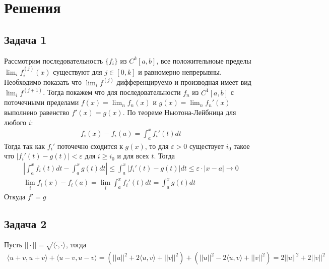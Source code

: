 
\newpage
\section*{Решения}
\subsection*{Задача 1}
	Рассмотрим последовательность $\{f_i\}$ из $C^k [a,b]$, все положительноые пределы $\lim_i f_i^{(j)}(x)$ существуют для $j \in [0,k]$ и равномерно непрерывны. Необходимо показать что $\lim_i f^{(j)}$ дифференцируемо и производная имеет вид $\lim_i f^{(j+1)}$. Тогда покажем что для последовательности $f_n$ из $C^{1}[a,b]$ с поточечными пределами $f(x) = \lim_n f_n(x)$ и $g(x) = \lim_n f_n'(x)$ выполнено равенство $f'(x) = g(x)$. По теореме Ньютона-Лейбница для любого $i$:
	\begin{gather*}
		f_i(x) - f_i(a) = \int_{a}^{x} f_i'(t)dt
	\end{gather*}
	Тогда так как $f_i'$ поточечно сходится к $g(x)$, то для $\varepsilon > 0$ существует $i_0$ такое что $|f_i'(t) - g(t)| < \varepsilon$ для $i \geqslant i_0$ и для всех $t$. Тогда
	\begin{gather*}
		\left|\int_a^x f_i(t)dt - \int_a^x g(t)dt \right| \leqslant
		\int_a^x |f_i'(t) - g(t)|dt \leqslant
		\varepsilon \cdot |x - a| \to 0\\
		\lim_i f_i(x) - f_i(a) =
		\lim_i \int_a^x f_i'(t)dt =
		\int_a^x g(t)dt
	\end{gather*}
	Откуда $f' = g$
\vskip 0.4in


\subsection*{Задача 2}
	Пусть $||\cdot|| = \sqrt{\langle \cdot, \cdot \rangle}$, тогда
	\begin{gather*}
		\langle u+v, u+v \rangle + \langle u-v, u-v\rangle 
		= (||u||^2 + 2\langle u,v \rangle + ||v||^2) + (||u||^2 - 2\langle u,v \rangle + ||v||^2)
		= 2||u||^2 + 2||v||^2
	\end{gather*}
	
